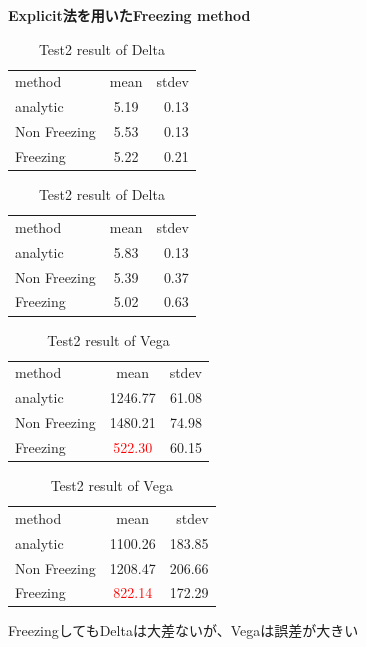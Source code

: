 \documentclass[driverfallback=dvipdfmx,cjk]{beamer}
\begin{document}
\begin{frame}\textbf{Explicit法を用いたFreezing method}
    \begin{table}[htb]
        \centering
        \begin{minipage}[t]{.45\textwidth}
            \caption{Test1 result of Delta}           
            \begin{tabular}{lcr}
                \hline
                method & mean & stdev \\
                analytic & 5.19& 0.13 \\
                Non Freezing & 5.53 & 0.13\\
                Freezing & 5.22 & 0.21
            \end{tabular}
        \end{minipage}
        \hfill
        \begin{minipage}[t]{.45\textwidth}
            \caption{Test2 result of Delta}           
            \begin{tabular}{lcr}
                \hline
                method & mean & stdev \\
                analytic & 5.83& 0.13 \\
                Non Freezing & 5.39 & 0.37\\
                Freezing & 5.02 & 0.63
            \end{tabular}
        \end{minipage}
    \end{table}
    \begin{table}[htb]
        \centering
        \begin{minipage}[t]{.45\textwidth}
            \caption{Test1 result of Vega}           
            \begin{tabular}{lcr}
                \hline
                method & mean & stdev \\
                analytic & 1246.77& 61.08 \\
                Non Freezing & 1480.21 & 74.98\\
                Freezing & \textcolor{red}{522.30} & 60.15
            \end{tabular}
        \end{minipage}
        \hfill
        \begin{minipage}[t]{.45\textwidth}
            \caption{Test2 result of Vega}           
            \begin{tabular}{lcr}
                \hline
                method & mean & stdev \\
                analytic & 1100.26 & 183.85\\
                Non Freezing & 1208.47 & 206.66\\
                Freezing & \textcolor{red}{822.14} & 172.29
            \end{tabular}
        \end{minipage}
    \end{table}
        FreezingしてもDeltaは大差ないが、Vegaは誤差が大きい
\end{frame}
\end{document}

